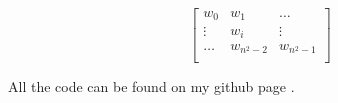 \begin{equation}\label{mtrx:wei}
  \begin{bmatrix}
    w_{0} & w_{1} & \dots \\
    \vdots & w_i & \vdots \\
    \dots & w_{n^2-2} & w_{n^2-1}\\
  \end{bmatrix}
\end{equation}

All the code can be found on my github page \cite{lstmGen}.
